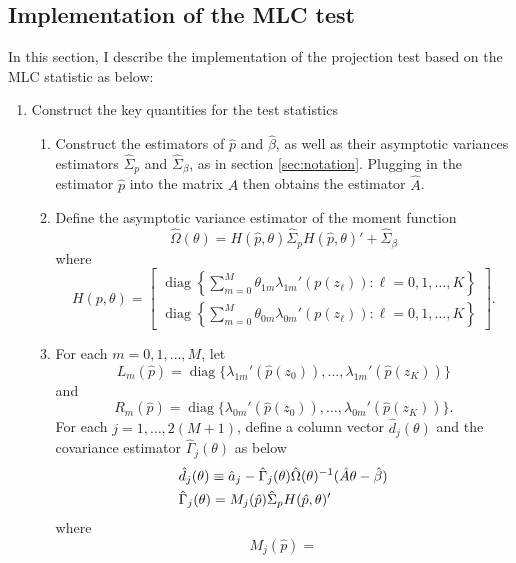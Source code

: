 \documentclass[11pt]{article}
\theoremstyle{definition}
\DeclareMathOperator*{\diag}{diag}
\newcommand{\0}{\ensuremath{\mathbf{0}}}
\begin{document}
\begin{bibunit}
\subsection{Implementation of the MLC test}
\label{sec:construct_MLC}
In this section, I describe the implementation of the projection test based on the MLC statistic as below:
\begin{enumerate}
\item Construct the key quantities for the test statistics
	\begin{enumerate}
	\item Construct the estimators of $\hat{p}$ and $\hat{\beta}$, as well as their asymptotic variances estimators $\hat{\Sigma}_p$ and $\hat{\Sigma}_\beta$, as in section \ref{sec:notation}. Plugging in the estimator $\hat{p}$ into the matrix $A$ then obtains the estimator $\hat{A}$.
%
%
%
%
%
%
%
%
%
%
%
%
%
%
%
%
%
%
%
%
%
%
	\item Define the asymptotic variance estimator of the moment function
	\begin{equation}
	\label{eq:asy_var_est}
	\hat{\Omega}(\theta) = H(\hat{p}, \theta)\hat{\Sigma}_p H(\hat{p}, \theta)' + \hat{\Sigma}_\beta
	\end{equation}
	where
	\[
	H(p,\theta) = 
	\begin{bmatrix}
		\diag\left\{\sum_{m=0}^M \theta_{1m} \lambda_{1m}'({p}(z_\ell)): \ell = 0,1,\ldots, K\right\} \\
		\diag\left\{\sum_{m=0}^M \theta_{0m} \lambda_{0m}'({p}(z_\ell)): \ell = 0,1,\ldots, K\right\}
	\end{bmatrix}.
	\]
	\item For each $m=0,1,\ldots,M$, let 
	\[
		L_m(\hat{p}) = \diag\{\lambda_{1m}'(\hat{p}(z_0)), \ldots, \lambda_{1m}'(\hat{p}(z_K))\}
	\] and  
	\[
		R_m(\hat{p}) = \diag\{\lambda_{0m}'(\hat{p}(z_0)), \ldots, \lambda_{0m}'(\hat{p}(z_K))\}.
	\] 
        For each $j=1,\ldots,2(M+1)$, define a column vector       $\hat{d}_j(\theta)$ and the covariance estimator $\hat{\Gamma}_j(\theta)$ as below
        \begin{align}
	& \hat{d}_j(\theta) \equiv \hat{a}_j - \hat{\Gamma}_j(\theta)\hat{\Omega}(\theta)^{-1}(\hat{A}\theta - \hat{\beta}) \notag \\
	& \hat{\Gamma}_{j}(\theta) = 
			M_{j} (\hat{p})
			\hat{\Sigma}_p 
			H(\hat{p},\theta)' \label{eq:asy_cov_est}
        \end{align}
        where
        \begin{equation}
            \label{eq:defn_M_mat}
            M_j(\hat{p}) = 

\end{equation}
\end{enumerate}
\end{enumerate}
\end{bibunit}
\end{document}
